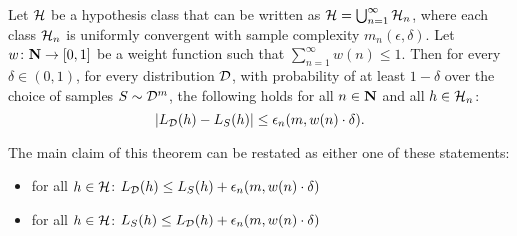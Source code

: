 \begin{theorem}
\label{thm:SRM1}
Let $\mathcal{H}$ be a hypothesis class that can be written as $\mathcal{H} =
\bigcup_{n = 1}^{\infty} \mathcal{H}_n$, where each class $\mathcal{H}_n$ is
uniformly convergent with sample complexity $m_n(\epsilon, \delta)$. Let $w
\colon \mathbf{N} \rightarrow [0, 1]$ be a weight function such that  $\sum_{n =
1}^{\infty} w(n) \leq 1$. Then for every $\delta \in (0, 1)$, for every
distribution $\mathcal{D}$, with probability of at least $1 - \delta$ over the choice
of samples $S \sim \mathcal{D}^m$, the following holds for all $n \in \mathbf{N}$ and all
$h \in \mathcal{H}_n$:
\[
    |L_{\mathcal{D}} (h) - L_S (h)| \leq \epsilon_n (m, w(n) \cdot \delta).
\]
\end{theorem}
The main claim of this theorem can be restated as either 
one of these statements:
\begin{itemize}
    \item for all $h \in \mathcal{H}$: 
        $L_{\mathcal{D}} (h) \leq L_S(h) + \epsilon_n (m, w(n) \cdot \delta)$
    \item for all $h \in \mathcal{H}$: 
    $L_{S} (h) \leq L_{\mathcal{D}}(h) + \epsilon_n (m, w(n) \cdot \delta)$
\end{itemize}

